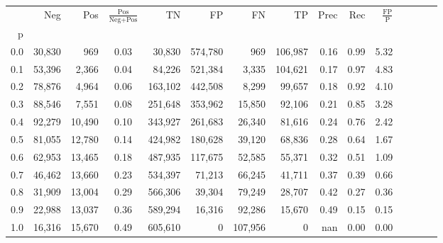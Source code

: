 \begin{tabular}{rrrcrrrrrrrrrrr}
\toprule
{} &     Neg &     Pos & $\frac{\text{Pos}}{\text{Neg}+\text{Pos}}$ &       TN &       FP &       FN &       TP &  Prec &   Rec & $\frac{\text{FP}}{\text{P}}$ \\
p   &         &         &                                            &          &          &          &          &       &       &                              \\
\midrule
0.0 &  30,830 &     969 &                                       0.03 &   30,830 &  574,780 &      969 &  106,987 &  0.16 &  0.99 &                         5.32 \\
0.1 &  53,396 &   2,366 &                                       0.04 &   84,226 &  521,384 &    3,335 &  104,621 &  0.17 &  0.97 &                         4.83 \\
0.2 &  78,876 &   4,964 &                                       0.06 &  163,102 &  442,508 &    8,299 &   99,657 &  0.18 &  0.92 &                         4.10 \\
0.3 &  88,546 &   7,551 &                                       0.08 &  251,648 &  353,962 &   15,850 &   92,106 &  0.21 &  0.85 &                         3.28 \\
0.4 &  92,279 &  10,490 &                                       0.10 &  343,927 &  261,683 &   26,340 &   81,616 &  0.24 &  0.76 &                         2.42 \\
0.5 &  81,055 &  12,780 &                                       0.14 &  424,982 &  180,628 &   39,120 &   68,836 &  0.28 &  0.64 &                         1.67 \\
0.6 &  62,953 &  13,465 &                                       0.18 &  487,935 &  117,675 &   52,585 &   55,371 &  0.32 &  0.51 &                         1.09 \\
0.7 &  46,462 &  13,660 &                                       0.23 &  534,397 &   71,213 &   66,245 &   41,711 &  0.37 &  0.39 &                         0.66 \\
0.8 &  31,909 &  13,004 &                                       0.29 &  566,306 &   39,304 &   79,249 &   28,707 &  0.42 &  0.27 &                         0.36 \\
0.9 &  22,988 &  13,037 &                                       0.36 &  589,294 &   16,316 &   92,286 &   15,670 &  0.49 &  0.15 &                         0.15 \\
1.0 &  16,316 &  15,670 &                                       0.49 &  605,610 &        0 &  107,956 &        0 &   nan &  0.00 &                         0.00 \\
\bottomrule
\end{tabular}
